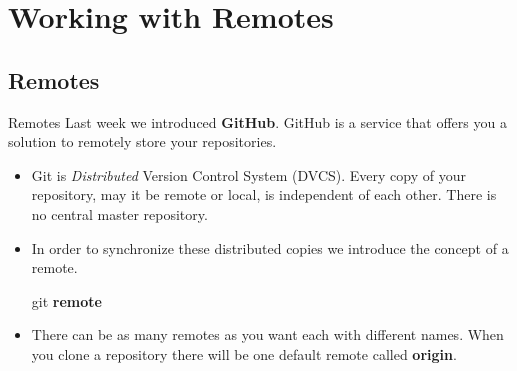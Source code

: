 \documentclass{beamer}
\begin{document}
\section{Working with Remotes}
\subsection{Remotes}
\begin{frame}{Remotes}
Last week we introduced \textbf{GitHub}. GitHub is a service that offers you a solution to remotely store your repositories.
\begin{itemize}
    \item Git is \emph{Distributed} Version Control System (DVCS). Every copy of your repository, may it be remote or local, is independent of each other. There is no central master repository. 
    \item In order to synchronize these distributed copies we introduce the concept of a remote.
  \begin{block}{}
    git \textbf{remote}
  \end{block}
  \item There can be as many remotes as you want each with different names. When you clone a repository there will be one default remote called \textbf{origin}.
\end{itemize}
\end{frame}
\end{document}
